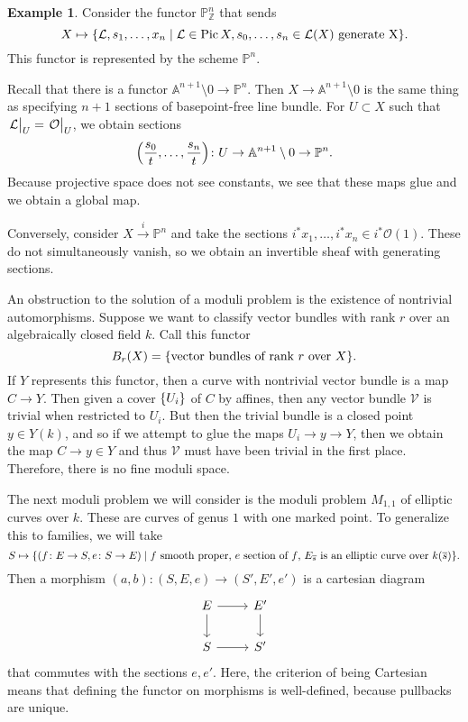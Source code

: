 \documentclass[leqno, openany]{memoir}
\theoremstyle{definition}
\newtheorem{exm}[thm]{Example}
\theoremstyle{remark}
\theoremstyle{plain}
\theoremstyle{definition}
\theoremstyle{remark}
\newcommand{\A}{\mathbb{A}}
\newcommand{\Z}{\mathbb{Z}}
\renewcommand{\P}{\mathbb{P}}
\newcommand{\mc}[1]{\mathcal{#1}}
\newcommand{\ol}[1]{\overline{#1}}
\DeclareMathOperator{\Pic}{Pic}
\begin{document}
\begin{exm}
    Consider the functor $\P^n_{\Z}$ that sends
    \[ X \mapsto \qty{\mc{L}, s_1, \ldots, x_n \mid \mc{L} \in \Pic X, s_0, \ldots, s_n \in \mc{L}(X) \text{ generate X} }. \]
    This functor is represented by the scheme $\P^n$.

    Recall that there is a functor $\A^{n+1} \setminus 0 \to \P^n$. Then $X \to \A^{n+1} \setminus 0$ is the same thing as specifying $n+1$ sections of basepoint-free line bundle. For $U \subset X$ such that $\eval{\mc{L}}_U = \eval{\mc{O}}_U$, we obtain sections 
    \[ \qty( \frac{s_0}{t}, \ldots, \frac{s_n}{t} ) \colon U \to \A^{n+1} \setminus 0 \to \P^n. \]
    Because projective space does not see constants, we see that these maps glue and we obtain a global map.

    Conversely, consider $X \xrightarrow{i} \P^n$ and take the sections $i^*x_1, \ldots, i^* x_n \in i^* \mc{O}(1)$. These do not simultaneously vanish, so we obtain an invertible sheaf with generating sections.
\end{exm}

An obstruction to the solution of a moduli problem is the existence of nontrivial automorphisms. Suppose we want to classify vector bundles with rank $r$ over an algebraically closed field $k$. Call this functor
\[ B_r(X) = \qty{\text{vector bundles of rank $r$ over $X$}}. \]
If $Y$ represents this functor, then a curve with nontrivial vector bundle is a map $C \to Y$. Then given a cover $\qty{U_i}$ of $C$ by affines, then any vector bundle $\mc{V}$ is trivial when restricted to $U_i$. But then the trivial bundle is a closed point $y \in Y(k)$, and so if we attempt to glue the maps $U_i \to y \to Y$, then we obtain the map $C \to y \in Y$ and thus $\mc{V}$ must have been trivial in the first place. Therefore, there is no fine moduli space.

The next moduli problem we will consider is the moduli problem $M_{1,1}$ of elliptic curves over $k$. These are curves of genus $1$ with one marked point. To generalize this to families, we will take
\[ S \mapsto \qty{(f \colon E \to S, e \colon S \to E) \mid \text{$f$ smooth proper, $e$ section of $f$, $E_{\ol{s}}$ is an elliptic curve over $k(\ol{s})$}}. \]
Then a morphism $(a,b) \colon (S,E,e) \to (S',E',e')$ is a cartesian diagram
\begin{equation*}
\begin{tikzcd}
    E \arrow{r} \arrow{d} & E' \arrow{d} \\
    S \arrow{r} & S'
\end{tikzcd}
\end{equation*}
that commutes with the sections $e,e'$. Here, the criterion of being Cartesian means that defining the functor on morphisms is well-defined, because pullbacks are unique.
\end{document}
